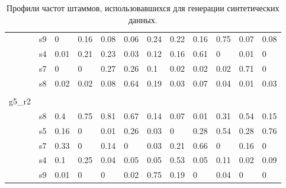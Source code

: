 \documentclass{spbau-diploma}
\begin{document}
\begin{appendices}
\begin{table}[!ht]
{\begin{tabular}{llllllllllll}
 & s9 & 0 & 0.16 & 0.08 & 0.06 & 0.24 & 0.22 & 0.16 & 0.75 & 0.07 & 0.08 \\
 & s4 & 0.01 & 0.21 & 0.23 & 0.03 & 0.12 & 0.16 & 0.61 & 0 & 0.01 & 0 \\
 & s7 & 0 & 0 & 0.27 & 0.26 & 0.1 & 0.02 & 0.02 & 0.02 & 0.71 & 0 \\
 & s8 & 0.02 & 0.02 & 0.08 & 0.64 & 0.19 & 0.03 & 0.07 & 0.04 & 0.01 & 0.03 \\
 &  &  &  &  &  &  &  &  &  &  &  \\
g5\_r2 &  &  &  &  &  &  &  &  &  &  &  \\
 & s8 & 0.4 & 0.75 & 0.81 & 0.67 & 0.14 & 0.07 & 0.01 & 0.31 & 0.54 & 0.15 \\
 & s5 & 0.16 & 0 & 0.01 & 0.26 & 0.03 & 0 & 0.28 & 0.54 & 0.28 & 0.76 \\
 & s7 & 0.33 & 0 & 0.14 & 0 & 0.03 & 0.21 & 0.66 & 0 & 0.16 & 0 \\
 & s4 & 0.1 & 0.25 & 0.04 & 0.05 & 0.05 & 0.53 & 0.05 & 0.11 & 0.02 & 0.09 \\
 & s9 & 0.01 & 0 & 0 & 0.02 & 0.75 & 0.19 & 0 & 0.04 & 0 & 0
\end{tabular}
}
\caption{Профили частот штаммов, использовавшихся для генерации синтетических данных.}
\label{table:profiles}
\end{table}

\end{appendices}
\end{document}
